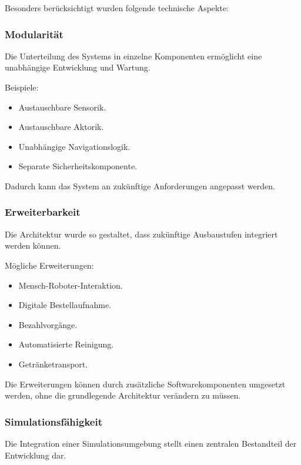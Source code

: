Besonders berücksichtigt wurden folgende technische Aspekte:

\subsubsection{Modularität}\label{modularituxe4t}

Die Unterteilung des Systems in einzelne Komponenten ermöglicht eine
unabhängige Entwicklung und Wartung.

Beispiele:

\begin{itemize}
\tightlist
\item
  Austauschbare Sensorik.
\item
  Austauschbare Aktorik.
\item
  Unabhängige Navigationslogik.
\item
  Separate Sicherheitskomponente.
\end{itemize}

Dadurch kann das System an zukünftige Anforderungen angepasst werden.

\subsubsection{Erweiterbarkeit}\label{erweiterbarkeit}

Die Architektur wurde so gestaltet, dass zukünftige Ausbaustufen
integriert werden können.

Mögliche Erweiterungen:

\begin{itemize}
\tightlist
\item
  Mensch-Roboter-Interaktion.
\item
  Digitale Bestellaufnahme.
\item
  Bezahlvorgänge.
\item
  Automatisierte Reinigung.
\item
  Getränketransport.
\end{itemize}

Die Erweiterungen können durch zusätzliche Softwarekomponenten umgesetzt
werden, ohne die grundlegende Architektur verändern zu müssen.

\subsubsection{Simulationsfähigkeit}\label{simulationsfuxe4higkeit}

Die Integration einer Simulationsumgebung stellt einen zentralen
Bestandteil der Entwicklung dar.

